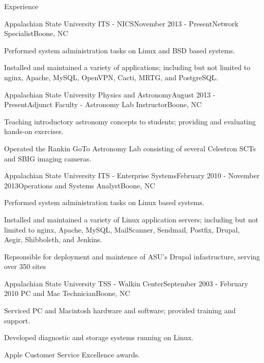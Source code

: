 \documentclass{cv} %
\begin{document}
\begin{rSection}{Experience}

\begin{rSubsection}{Appalachian State University ITS - NICS}{November 2013 - Present}{Network Specialist}{Boone, NC}
\item Performed system administration tasks on Linux and BSD based systems.
\item Installed and maintained a variety of applications; including but not limited to nginx, Apache, MySQL, OpenVPN, Cacti, MRTG, and PostgreSQL.
\end{rSubsection}

\begin{rSubsection}{Appalachian State University Physics and Astronomy}{August 2013 - Present}{Adjunct Faculty - Astronomy Lab Instructor}{Boone, NC}
\item Teaching introductory astronomy concepts to students; providing and evaluating hands-on exercises.
\item Operated the Rankin GoTo Astronomy Lab consisting of several Celestron SCTs and SBIG imaging cameras.
\end{rSubsection}

\begin{rSubsection}{Appalachian State University ITS - Enterprise Systems}{February 2010 - November 2013}{Operations and Systems Analyst}{Boone, NC}
\item Performed system administration tasks on Linux based systems.
\item Installed and maintained a variety of Linux application servers; including but not limited to nginx, Apache, MySQL, MailScanner, Sendmail, Postfix, Drupal, Aegir, Shibboleth, and Jenkins.
\item Repsonsible for deployment and maintence of ASU's Drupal infastructure, serving over 350 sites
\end{rSubsection}

\begin{rSubsection}{Appalachian State University TSS - Walkin Center}{September 2003 - February 2010
}{PC and Mac Technician}{Boone, NC}
\item Serviced PC and Macintosh hardware and software; provided training and support.
\item Developed diagnostic and storage systems running on Linux.
\item Apple Customer Service Excellence awards.
\end{rSubsection}


\end{rSection}
\end{document}
